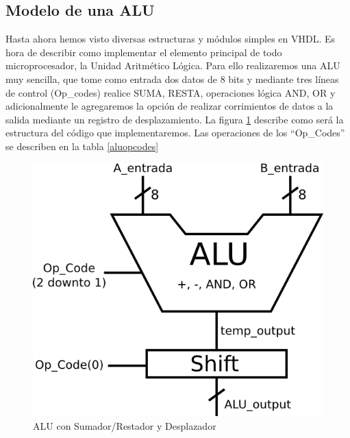 \subsection{Modelo de una ALU}
Hasta ahora hemos visto diversas estructuras y módulos simples en VHDL. Es hora de describir como 
implementar el elemento principal de todo microprocesador, la Unidad Aritmético Lógica. Para ello
realizaremos una ALU muy sencilla, que tome como entrada dos datos de 8 bits y mediante tres líneas
de control (Op\_codes) realice SUMA, RESTA, operaciones lógica AND, OR y adicionalmente le agregaremos
la opción de realizar corrimientos de datos a la salida mediante un registro de desplazamiento.
La figura \ref{alu} describe como será la estructura del código que implementaremos.
Las operaciones de los ``Op\_Codes'' se describen en la tabla \ref{aluopcodes}

\begin{figure}[h]
  \centering
    \includegraphics[width=.5\textwidth]{graficos/alu.png}
  \caption{ALU con Sumador/Restador y Desplazador}
  \label{alu}
\end{figure}

